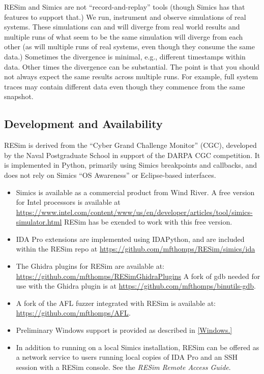 \documentclass[titlepage]{article}
\begin{document}
RESim and Simics are not ``record-and-replay'' tools (though Simics has that features to support that.)  We run, instrument and observe simulations of real systems.
These simulations can and will diverge from real world results and multiple runs of what seem to be the same simulation will diverge from each other (as will
multiple runs of real systems, even though they consume the same data.)  Sometimes the divergence is minimal, e.g., different timestamps within data.  Other times
the divergence can be substantial.  The point is that you should not always expect the same results across multiple runs.  For example, full system traces
may contain different data even though they commence from the same snapshot.  

\subsection{Development and Availability}
RESim is derived from the “Cyber Grand Challenge Monitor” (CGC), developed by the Naval Postgraduate School in support of the DARPA CGC competition.  
It is implemented in Python, primarily using Simics breakpoints and callbacks, and does not rely on 
Simics “OS Awareness” or Eclipse-based interfaces.   
\begin{itemize}
\item Simics is available as a commercial product from Wind River.  A free version for Intel processors is available at
\url{https://www.intel.com/content/www/us/en/developer/articles/tool/simics-simulator.html}  RESim has be exended to work with this
free version.

\item IDA Pro extensions are implemented using IDAPython, and are included within the RESim repo at
\url{https://github.com/mfthomps/RESim/simics/ida}  

\item The Ghidra plugins for RESim are available at: \url{https://github.com/mfthomps/RESimGhidraPlugins}  A fork 
of gdb needed for use with the Ghidra plugin is at \url{https://github.com/mfthomps/binutils-gdb}.

\item A fork of the AFL fuzzer integrated with 
RESim is available at: \url{https://github.com/mfthomps/AFL}.

\item Preliminary Windows support is provided as described in \ref{Windows.}

\item In addition to running on a local Simics installation, RESim can be offered as a network service to users running local copies of IDA Pro and an SSH session with a RESim console.  See the \textit{RESim Remote Access Guide}.  
\end{itemize}
\end{document}
